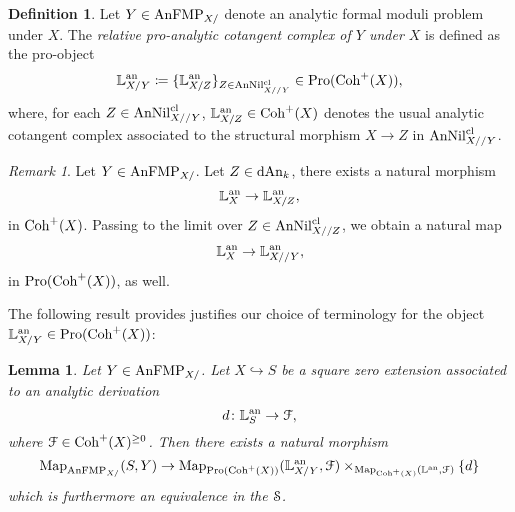 \documentclass[10pt,a4paper,reqno]{amsart} %
\theoremstyle{plain}
\newtheorem{lem}[thm]{Lemma}
\theoremstyle{definition}
\newtheorem{defin}[thm]{Definition}
\theoremstyle{remark}
\newtheorem{rem}[thm]{Remark}
\numberwithin{equation}{section}
\begin{document}
\begin{defin}
    Let $Y \in \mathrm{AnFMP}_{X/}$ denote an analytic formal moduli problem under $X$. The \emph{relative pro-analytic cotangent complex of $Y$ under $X$} is defined as the pro-object
        \[
            \mathbb L^\mathrm{an}_{X/Y} \coloneqq \{ \mathbb L^\mathrm{an}_{X/Z} \}_{Z \in \mathrm{AnNil}^{\mathrm{cl}}_{X//Y}}  \in \mathrm{Pro}(\mathrm{Coh}^+(X)),
        \]
    where, for each $Z \in \mathrm{AnNil}^{\mathrm{cl}}_{X//Y}$, $\mathbb L^\mathrm{an}_{X/Z} \in \mathrm{Coh}^+(X)$ denotes the usual analytic cotangent complex associated to
    the structural morphism $X \to Z$ in $\mathrm{AnNil}^{\mathrm{cl}}_{X//Y}$.
\end{defin}

\begin{rem}
    Let $Y \in \mathrm{AnFMP}_{X/}$. Let $Z \in \mathrm{dAn}_k$, there exists a natural morphism
        \[
            \mathbb L^\mathrm{an}_X \to \mathbb L^\mathrm{an}_{X/Z} ,  
        \]
    in $\mathrm{Coh}^+(X)$. Passing to the limit over $Z \in \mathrm{AnNil}^{\mathrm{cl}}_{X//Z}$, we obtain a natural map
        \[
            \mathbb L^\mathrm{an}_X \to \mathbb L^\mathrm{an}_{X//Y},  
        \]
    in $\mathrm{Pro}(\mathrm{Coh}^+(X))$, as well.
\end{rem}

The following result provides justifies our choice of terminology for the object $\mathbb L^\mathrm{an}_{X/Y} \in \mathrm{Pro}(\mathrm{Coh}^+(X))$:

\begin{lem} \label{lem:pro_cot_complex_classifies_nil_extensions_for_analytic_moduli_problems}
    Let $Y \in \mathrm{AnFMP}_{X/}$. Let $X \hookrightarrow S$ be a square zero extension associated to an analytic derivation
        \[
            d \colon \mathbb L^\mathrm{an}_S \to \mathcal F ,  
        \]
    where $\mathcal F \in \mathrm{Coh}^+(X)^{\ge 0}$. Then there exists a natural morphism
        \[
            \operatorname{Map}_{\mathrm{AnFMP}_{X/}}(S, Y) \to \operatorname{Map}_{\mathrm{Pro}(\mathrm{Coh}^+(X))}(\mathbb L^\mathrm{an}_{X/Y}, \mathcal F) \times_{\operatorname{Map}_{\mathrm{Coh}^+(X)}(\mathbb L^\mathrm{an}, \mathcal F)} \{ d \}
        \]
    which is furthermore an equivalence in the \infcat $\mathcal S$.
\end{lem}
\end{document}
